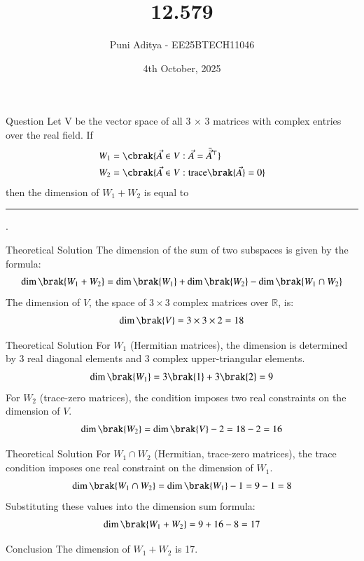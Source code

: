 \documentclass{beamer}
\title{12.579}
\date{4th October, 2025}
\author{Puni Aditya - EE25BTECH11046}
\begin{document}
\frame{\titlepage}
\begin{frame}{Question}
Let V be the vector space of all 3 × 3 matrices with complex entries over the real
field. If
\begin{align*}
    W_1 &= \cbrak{\vec{A} \in V : \vec{A} = \bar{\vec{A}}^\top} \\
    W_2 &= \cbrak{\vec{A} \in V : \text{trace} \brak{\vec{A}} = 0}
\end{align*}
then the dimension of $W_1 + W_2$ is equal to \rule{2cm}{0.4pt}.
\end{frame}

\begin{frame}{Theoretical Solution}
The dimension of the sum of two subspaces is given by the formula:
\begin{align}
    \dim\brak{W_1 + W_2} = \dim\brak{W_1} + \dim\brak{W_2} - \dim\brak{W_1 \cap W_2}
\end{align}
The dimension of $V$, the space of $3 \times 3$ complex matrices over $\mathbb{R}$, is:
\begin{align}
    \dim\brak{V} = 3 \times 3 \times 2 = 18
\end{align}
\end{frame}

\begin{frame}{Theoretical Solution}
For $W_1$ (Hermitian matrices), the dimension is determined by 3 real diagonal elements and 3 complex upper-triangular elements.
\begin{align}
    \dim\brak{W_1} = 3\brak{1} + 3\brak{2} = 9
\end{align}
For $W_2$ (trace-zero matrices), the condition imposes two real constraints on the dimension of $V$.
\begin{align}
    \dim\brak{W_2} = \dim\brak{V} - 2 = 18 - 2 = 16
\end{align}
\end{frame}

\begin{frame}{Theoretical Solution}
For $W_1 \cap W_2$ (Hermitian, trace-zero matrices), the trace condition imposes one real constraint on the dimension of $W_1$.
\begin{align}
    \dim\brak{W_1 \cap W_2} = \dim\brak{W_1} - 1 = 9 - 1 = 8
\end{align}
Substituting these values into the dimension sum formula:
\begin{align}
    \dim\brak{W_1 + W_2} = 9 + 16 - 8 = 17
\end{align}
\end{frame}

\begin{frame}{Conclusion}
The dimension of $W_1 + W_2$ is 17.
\end{frame}
\end{document}
